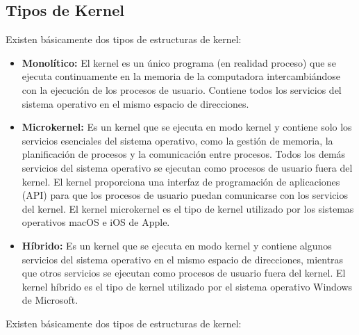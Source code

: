 \documentclass[../main.tex]{subfiles}
\begin{document}
    \subsection*{Tipos de Kernel}
        Existen básicamente dos tipos de estructuras de kernel:
        \begin{itemize}
            \item \textbf{Monolítico:} El kernel es un único programa (en realidad proceso) que se ejecuta continuamente en la memoria de la computadora intercambiándose con la ejecución de los procesos de usuario. Contiene todos los servicios del sistema operativo en el mismo espacio de direcciones.
            \item \textbf{Microkernel:} Es un kernel que se ejecuta en modo kernel y contiene solo los servicios esenciales del sistema operativo, como la gestión de memoria, la planificación de procesos y la comunicación entre procesos. Todos los demás servicios del sistema operativo se ejecutan como procesos de usuario fuera del kernel. El kernel proporciona una interfaz de programación de aplicaciones (API) para que los procesos de usuario puedan comunicarse con los servicios del kernel. El kernel microkernel es el tipo de kernel utilizado por los sistemas operativos macOS e iOS de Apple.
            \item \textbf{Híbrido:} Es un kernel que se ejecuta en modo kernel y contiene algunos servicios del sistema operativo en el mismo espacio de direcciones, mientras que otros servicios se ejecutan como procesos de usuario fuera del kernel. El kernel híbrido es el tipo de kernel utilizado por el sistema operativo Windows de Microsoft.
        \end{itemize}Existen básicamente dos tipos de estructuras de kernel:   
        
        
\end{document}
